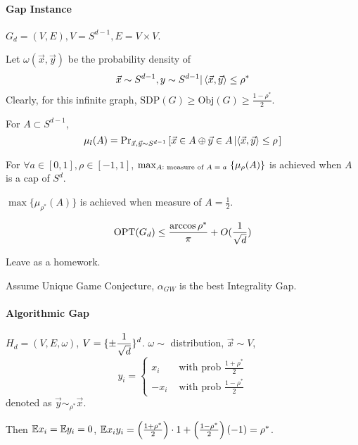 \paragraph{Gap Instance}  $G_d=(V,E), V=S^{d-1},E=V\times V $.

Let  $ \omega(\vec{x},\vec{y}) $ be the probability density of 
\[\vec{x}\sim S^{d-1},y\sim S^{d-1}|\left<\vec{x},\vec{y}\right> \leq \rho^*\]
Clearly, for this infinite graph,  $ \mathrm{SDP}(G) \geq \mathrm{Obj}(G) \geq \frac{1-\rho^*}{2} $. 

For  $ A\subset S^{d-1}$, 
\[\mu_l(A)=\mathrm{Pr}_{\vec{x},\vec{y}\sim S^{d-1}}\left[\vec{x}\in A\oplus \vec{y}\in A\left|\left<\vec{x},\vec{y}\right> \leq \rho\right.\right]\] 
\begin{theorem}
    For  $ \forall a\in [0,1],\rho\in [-1,1] $,  $ \max_{A:\text{ measure of  $ A=a $ }}\{\mu_{\rho}(A)\} $ is achieved when  $ A  $ is a cap of  $ S^d $.   
\end{theorem}
\begin{corollary}
     $ \max\{\mu_{\rho^*}(A)\} $ is achieved when measure of  $ A=\frac{1}{2} $.   
\end{corollary}
\begin{claim}
    \[\mathrm{OPT}(G_d) \leq \frac{\arccos \rho^*}{\pi}+O(\frac{1}{\sqrt{d}}) \]
\end{claim}
Leave as a homework.

Assume Unique Game Conjecture,  $ \alpha_{GW} $ is the best Integrality Gap.

\paragraph{Algorithmic Gap}
\begin{example}[Instance]
    $ H_d=(V,E,\omega) $,  $ \displaystyle V=\{\pm\frac{1}{\sqrt{d}}\}^d $.  $ \omega\sim  $ distribution,  $ \vec{x}\sim V $, 
    \begin{equation}
        y_i=\begin{cases}
            x_i&\text{ with prob } \frac{1+\rho^*}{2}\\
            -x_i&\text{ with prob } \frac{1-\rho^*}{2}
        \end{cases}\label{def: sim_rho}
    \end{equation}
    denoted as  $ \vec{y}\sim_{\rho^*}\vec{x} $.
    
    Then  $ \mathbb E x_i=\mathbb E y_i=0 $,  $ \mathbb E x_iy_i=\left(\frac{1+\rho^*}{2}\right)\cdot 1+\left(\frac{1-\rho^*}{2}\right)(-1)=\rho^* $.
\end{example}

